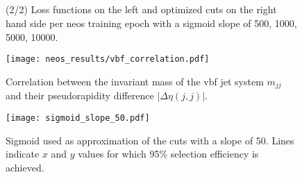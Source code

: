 \begin{figure}
    \centering
    \\
    \\
    \\
    \\
    \caption[]{(2/2) Loss functions on the left and optimized cuts on the right hand side per \ac{neos} training epoch with a sigmoid slope of 500, 1000, 5000, 10000.}
    \label{fig:slope_study_2}
\end{figure}




\begin{figure}
    \centering
    \texttt{[image: neos\_results/vbf\_correlation.pdf]}
    \caption[]{Correlation between the invariant mass of the \ac{vbf} jet system $m_{jj}$ and their pseudorapidity difference $|\Delta\eta(j,j)|$.}
    \label{fig:vbf_correlation}
\end{figure}

\begin{figure}
    \centering
    \texttt{[image: sigmoid\_slope\_50.pdf]}
    \caption[]{Sigmoid used as approximation of the cuts with a slope of 50. Lines indicate $x$ and $y$ values for which 95\% selection efficiency is achieved.}
    \label{fig:sigmoid_slope_50}
\end{figure}





